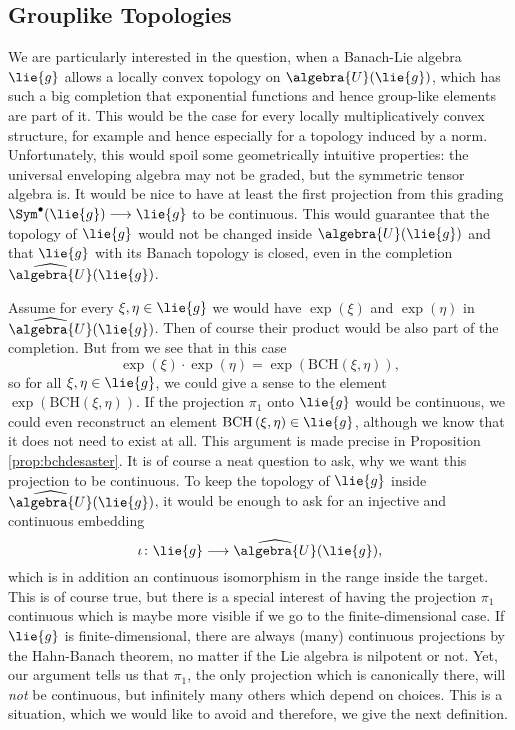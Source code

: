 \documentclass[
11pt,                          %
english                        %
]{article}
\newcommand{\bch}[2]{\mathrm{BCH}\left(#1, #2\right)}
\begin{document}
\subsection{Grouplike Topologies}
We are particularly interested in the question, when a Banach-Lie algebra $\lie{g}$ 
allows a locally convex topology on $\algebra{U}(\lie{g})$, which has such a big 
completion that exponential functions and hence group-like elements are part of it. This would be the case for every locally multiplicatively convex structure, for example and hence especially for a topology induced by a norm. Unfortunately, this would spoil some geometrically intuitive properties: the universal enveloping algebra may not be graded, but the symmetric tensor algebra is. It would be nice to have at least the first projection from this grading $\Sym^{\bullet}(\lie{g}) \longrightarrow \lie{g}$ to be continuous. This would guarantee that the topology of $\lie{g}$ would not be changed inside $\algebra{U}(\lie{g})$ and that $\lie{g}$ with its Banach topology is closed, even in the completion $\widehat{\algebra{U}}(\lie{g})$. 
\begin{remark}
	\label{rem:BCHDesaster}
	Assume for every $\xi, \eta \in \lie{g}$ we would have $\exp(\xi)$ and 
	$\exp(\eta)$ in $\widehat{\algebra{U}}(\lie{g})$. Then of course their product 
	would be also part of the completion. But from 
	\cite{esposito.stapor.waldmann:2015a:pre} we see that in this case
	\begin{equation*}
		\exp(\xi) \cdot \exp(\eta)
		=
		\exp\left(
			\bch{\xi}{\eta}
		\right),
	\end{equation*}
	so for all $\xi, \eta \in \lie{g}$, we could give a sense to the element 
	$\exp\left( \bch{\xi}{\eta} \right)$. If the projection $\pi_1$ onto $\lie{g}$ 
	would be continuous, we could even reconstruct an element $\bch{\xi}{\eta} \in 
	\lie{g}$, although we know that it does not need to exist at all. This argument 
	is made precise in Proposition \ref{prop:bchdesaster}.
	It is of course a neat question to ask, why we want this projection to be 
	continuous. To keep the topology of $\lie{g}$ inside $\widehat{\algebra{U}}
	(\lie{g})$, it would be enough to ask for an injective and continuous embedding 
	\begin{equation*}
		\iota
		\colon
		\lie{g}
		\longrightarrow
		\widehat{\algebra{U}}(\lie{g}),
	\end{equation*}
	which is in addition an continuous isomorphism in the range inside the target.
	This is of course true, but there is a special interest of having the projection 
	$\pi_1$ 	continuous which is maybe more visible if we go to the finite-dimensional 
	case. If $\lie{g}$ is finite-dimensional, there are always (many) continuous
	projections by the Hahn-Banach theorem, no matter if the Lie algebra is nilpotent 
	or not. Yet, our argument tells us that $\pi_1$, the only projection which is 
	canonically there, will \emph{not} be continuous, but infinitely many others
	which depend on choices. This is a situation, which we would like to avoid and 
	therefore, we give the next definition.
\end{remark}
\end{document}
